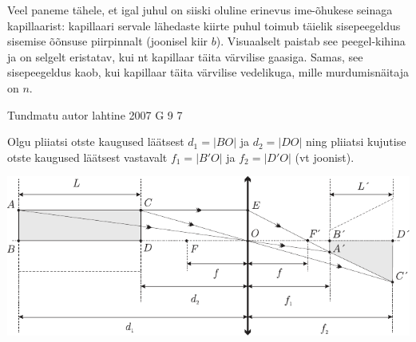 \documentclass[11pt]{article}
\begin{document}
{{Veel paneme tähele, et igal juhul on siiski oluline erinevus ime-õhukese seinaga kapillaarist: kapillaari servale lähedaste kiirte puhul toimub täielik sisepeegeldus sisemise õõnsuse piirpinnalt (joonisel kiir $b$). Visuaalselt paistab see peegel-kihina ja on selgelt eristatav, kui nt kapillaar täita värvilise gaasiga. Samas, see sisepeegeldus kaob, kui kapillaar täita värvilise vedelikuga, mille murdumisnäitaja on $n$.
\fi
}

{Tundmatu autor} %
{lahtine} %
{2007} %
{G 9} %
{7} %
{

\ifSolution
Olgu pliiatsi otste kaugused läätsest $d_1 = |BO|$ ja $d_2 = |DO|$ ning pliiatsi kujutise otste kaugused läätsest vastavalt $f_1 = |B'O|$ ja $f_2 = |D'O|$ (vt joonist).

\begin{center}
	\includegraphics[width=\linewidth]{2007-lahg-09-lah}
\end{center}

}}
\end{document}
